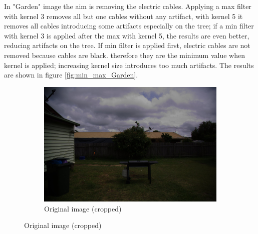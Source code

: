 \documentclass{article}
\begin{document}
In "Garden" image the aim is removing the electric cables. Applying a max filter with kernel 3 removes all but one cables without any artifact, with kernel 5 it removes all cables introducing some artifacts especially on the tree; if a min filter with kernel 3 is applied after the max with kernel 5, the results are even better, reducing artifacts on the tree.
If min filter is applied first, electric cables are not removed because cables are black. therefore they are the minimum value when kernel is applied; increasing kernel size introduces too much artifacts.
The results are shown in figure \ref{fig:min_max_Garden}.
\begin{figure}[H]
	\centering
	\begin{subfigure}{0.45\textwidth}
		\includegraphics[trim={20cm 25cm 25cm 10cm},clip,width=\textwidth]{Garden.jpg}
		\caption{Original image (cropped)}
	\end{subfigure}


\end{figure}
\end{document}
